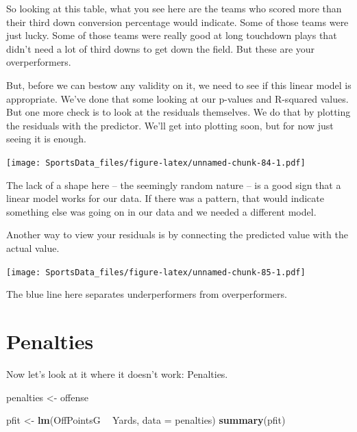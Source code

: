 \documentclass[]{book}
\newenvironment{Shaded}{\begin{snugshade}}{\end{snugshade}}
\newcommand{\DataTypeTok}[1]{\textcolor[rgb]{0.13,0.29,0.53}{#1}}
\newcommand{\KeywordTok}[1]{\textcolor[rgb]{0.13,0.29,0.53}{\textbf{#1}}}
\newcommand{\NormalTok}[1]{#1}
\newcommand{\OperatorTok}[1]{\textcolor[rgb]{0.81,0.36,0.00}{\textbf{#1}}}
\newcommand{\StringTok}[1]{\textcolor[rgb]{0.31,0.60,0.02}{#1}}
\begin{document}
So looking at this table, what you see here are the teams who scored more than their third down conversion percentage would indicate. Some of those teams were just lucky. Some of those teams were really good at long touchdown plays that didn't need a lot of third downs to get down the field. But these are your overperformers.

But, before we can bestow any validity on it, we need to see if this linear model is appropriate. We've done that some looking at our p-values and R-squared values. But one more check is to look at the residuals themselves. We do that by plotting the residuals with the predictor. We'll get into plotting soon, but for now just seeing it is enough.

\texttt{[image: SportsData\_files/figure-latex/unnamed-chunk-84-1.pdf]}

The lack of a shape here -- the seemingly random nature -- is a good sign that a linear model works for our data. If there was a pattern, that would indicate something else was going on in our data and we needed a different model.

Another way to view your residuals is by connecting the predicted value with the actual value.

\texttt{[image: SportsData\_files/figure-latex/unnamed-chunk-85-1.pdf]}

The blue line here separates underperformers from overperformers.

\hypertarget{penalties}{%
\section{Penalties}\label{penalties}}

Now let's look at it where it doesn't work: Penalties.

\begin{Shaded}
\begin{Highlighting}[]
\NormalTok{penalties <-}\StringTok{ }\NormalTok{offense}
\end{Highlighting}
\end{Shaded}

\begin{Shaded}
\begin{Highlighting}[]
\NormalTok{pfit <-}\StringTok{ }\KeywordTok{lm}\NormalTok{(OffPointsG }\OperatorTok{~}\StringTok{ }\NormalTok{Yards, }\DataTypeTok{data =}\NormalTok{ penalties)}
\KeywordTok{summary}\NormalTok{(pfit)}
\end{Highlighting}
\end{Shaded}
\end{document}
